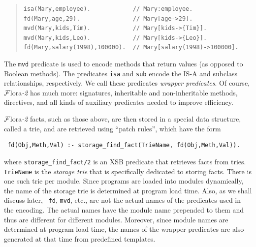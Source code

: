 \documentclass[11pt]{article}
\newcommand{\FLORA}{{\mbox{\sc ${\cal F}${lora}\rm\emph{-2}}}\xspace}
\begin{document}
\begin{quote}
\begin{verbatim}
isa(Mary,employee).            // Mary:employee.
fd(Mary,age,29).               // Mary[age->29].
mvd(Mary,kids,Tim).            // Mary[kids->{Tim}].
mvd(Mary,kids,Leo).            // Mary[kids->{Leo}].
fd(Mary,salary(1998),100000).  // Mary[salary(1998)->100000].
\end{verbatim}
\end{quote}

The {\tt mvd} predicate is used to encode methods that return values (as
opposed to Boolean methods).
The predicates {\tt isa} and {\tt sub}
encode the IS-A and subclass relationships, respectively.
We call these predicates \emph{wrapper predicates}. 
Of course, \FLORA has much more: signatures, inheritable and
non-inheritable methods, directives, and all kinds of auxiliary predicates
needed to improve efficiency.

\FLORA facts, such as those above, are then stored in a special data structure,
called a {\rm trie}, and are retrieved using  ``patch rules'', which have the
form
\begin{verbatim}
 fd(Obj,Meth,Val) :- storage_find_fact(TrieName, fd(Obj,Meth,Val)).  
\end{verbatim}
where {\tt storage\_find\_fact/2} is an XSB predicate that retrieves facts
from tries. {\tt TrieName} is the \emph{storage trie} that is specifically
dedicated to storing facts. There is one such trie per module. Since
programs are loaded into modules dynamically, the name of the storage trie
is determined at program load time. Also, as we shall discuss later, {\tt
  fd}, {\tt mvd}, etc., are not the actual names of the predicates used in
the encoding. The actual names have the module name prepended to them and
thus are different for different modules. Moreover, since module names are
determined at program load time, the names of the wrapper predicates are
also generated at that time from predefined templates.
\end{document}
